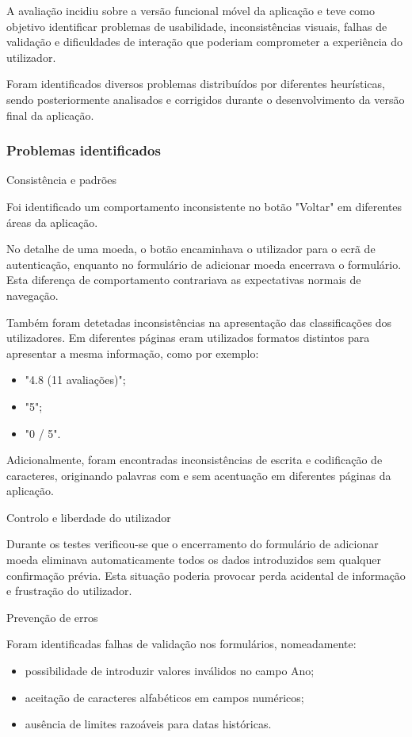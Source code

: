 \documentclass[12pt,a4paper]{article}
\begin{document}
A avaliação incidiu sobre a versão funcional móvel da aplicação e teve como objetivo identificar problemas de usabilidade, inconsistências visuais, falhas de validação e dificuldades de interação que poderiam comprometer a experiência do utilizador.

Foram identificados diversos problemas distribuídos por diferentes heurísticas, sendo posteriormente analisados e corrigidos durante o desenvolvimento da versão final da aplicação.

\subsubsection{Problemas identificados}

Consistência e padrões

Foi identificado um comportamento inconsistente no botão "Voltar" em diferentes áreas da aplicação.

No detalhe de uma moeda, o botão encaminhava o utilizador para o ecrã de autenticação, enquanto no formulário de adicionar moeda encerrava o formulário. Esta diferença de comportamento contrariava as expectativas normais de navegação.

Também foram detetadas inconsistências na apresentação das classificações dos utilizadores. Em diferentes páginas eram utilizados formatos distintos para apresentar a mesma informação, como por exemplo:

\begin{itemize}
\setlength{\itemsep}{0.15em}
\item "4.8 (11 avaliações)";
\item "5";
\item "0 / 5".
\end{itemize}

Adicionalmente, foram encontradas inconsistências de escrita e codificação de caracteres, originando palavras com e sem acentuação em diferentes páginas da aplicação.

Controlo e liberdade do utilizador

Durante os testes verificou-se que o encerramento do formulário de adicionar moeda eliminava automaticamente todos os dados introduzidos sem qualquer confirmação prévia. Esta situação poderia provocar perda acidental de informação e frustração do utilizador.

Prevenção de erros

Foram identificadas falhas de validação nos formulários, nomeadamente:

\begin{itemize}
\setlength{\itemsep}{0.15em}
\item possibilidade de introduzir valores inválidos no campo Ano;
\item aceitação de caracteres alfabéticos em campos numéricos;
\item ausência de limites razoáveis para datas históricas.
\end{itemize}
\end{document}
